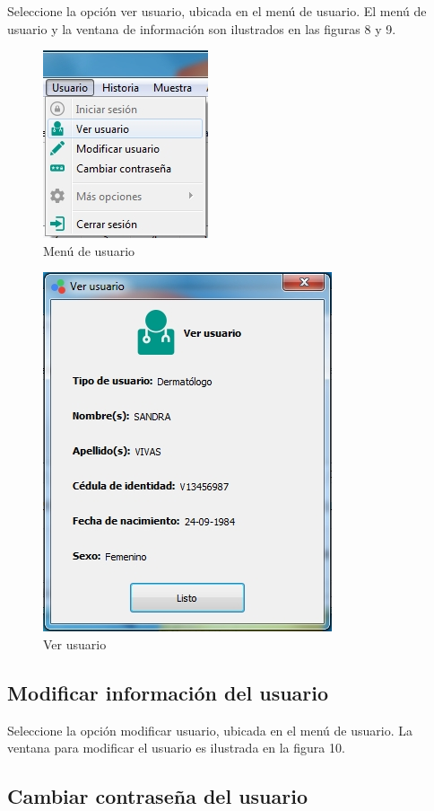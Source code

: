 	Seleccione la opci\'{o}n ver usuario, ubicada en el men\'{u} de usuario. El men\'{u} de usuario y la ventana de informaci\'{o}n son ilustrados en las figuras 8 y 9.

\begin{figure}[H]
  \centering
  \includegraphics[width=.3\linewidth]{./img/menu-usuario.jpg}
\caption{Men\'{u} de usuario}
\end{figure}

\begin{figure}[H]
  \centering
  \includegraphics[width=.5\linewidth]{./img/ver-usuario.jpg}
\caption{Ver usuario}
\end{figure}

\newpage

	\subsection{Modificar informaci\'{o}n del usuario}
	
	Seleccione la opci\'{o}n modificar usuario, ubicada en el men\'{u} de usuario. La ventana para modificar el usuario es ilustrada en la figura 10.

	\subsection{Cambiar contrase\~{n}a del usuario}
	
